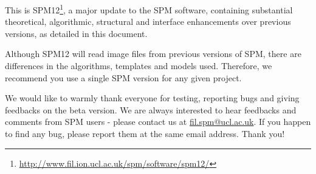 \documentclass[a4paper,titlepage,openany]{article}
\begin{document}
\let\oldlabel=\label
\renewcommand{\label}[1]{
{\pdfdest name {#1} fit}
\oldlabel{#1}
}

\newlength{\centeroffset}
\setlength{\centeroffset}{-0.5\oddsidemargin}
\addtolength{\centeroffset}{0.5\evensidemargin}
\thispagestyle{empty}
\noindent\hspace*{\centeroffset}

\noindent\hspace*{\centeroffset}

\vspace{10mm}

This is SPM12\footnote{\url{http://www.fil.ion.ucl.ac.uk/spm/software/spm12/}}, a major update to the SPM software, containing substantial theoretical, algorithmic, structural and interface enhancements over previous versions, as detailed in this document.

Although SPM12 will read image files from previous versions of SPM, there are differences in the algorithms, templates and models used. Therefore, we recommend you use a single SPM version for any given project.

We would like to warmly thank everyone for testing, reporting bugs and giving feedbacks on the beta version.
We are always interested to hear feedbacks and comments from SPM users - please contact us at \href{mailto:fil.spm@ucl.ac.uk}{fil.spm@ucl.ac.uk}.
If you happen to find any bug, please report them at the same email address. Thank you!
\end{document}

